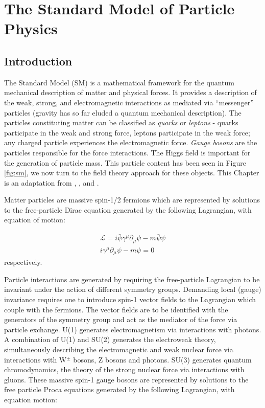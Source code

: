 \chapter{The Standard Model of Particle Physics}
\label{chap:sm}

\section{Introduction}

The Standard Model (SM) is a mathematical framework for the quantum mechanical description of matter and physical forces. It provides a description of the weak, strong, and electromagnetic interactions as mediated via ``messenger'' particles (gravity has so far eluded a quantum mechanical description). The particles constituting matter can be classified as \textit{quarks} or \textit{leptons} - quarks participate in the weak and strong force, leptons participate in the weak force; any charged particle experiences the electromagnetic force. \textit{Gauge bosons} are the particles responsible for the force interactions. The Higgs field is important for the generation of particle mass. This particle content has been seen in Figure \ref{fig:sm}, we now turn to the field theory approach for these objects. This Chapter is an adaptation from \cite{thomson}, \cite{halzmar}, and \cite{griffiths}.

Matter particles are massive spin-1/2 fermions which are represented by solutions to the free-particle Dirac equation generated by the following Lagrangian, with equation of motion:

\begin{equation}
\begin{array}{l}
\mathcal{L} = i\bar{\psi}\gamma^{\mu}\partial_{\mu}\psi - m\bar{\psi}\psi\\
i\gamma^{\mu}\partial_{\mu}\psi - m\psi = 0
\end{array}
\end{equation}
respectively.

Particle interactions are generated by requiring the free-particle Lagrangian to be invariant under the action of different symmetry groups. Demanding local (gauge) invariance requires one to introduce spin-1 vector fields to the Lagrangian which couple with the fermions. The vector fields are to be identified with the generators of the symmetry group and act as the mediator of the force via particle exchange. U(1) generates electromagnetism via interactions with photons. A combination of U(1) and SU(2) generates the electroweak theory, simultaneously describing the electromagnetic and weak nuclear force via interactions with W$^{\pm}$ bosons, Z bosons and photons. SU(3) generates quantum chromodynamics, the theory of the strong nuclear force via interactions with gluons. These massive spin-1 gauge bosons are represented by solutions to the free particle Proca equations generated by the following Lagrangian, with equation motion:

